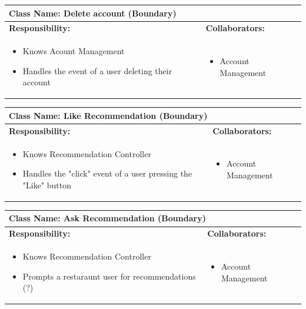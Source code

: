 \documentclass[]{article}
\begin{document}
\begin{table}[H]
	\centering
	\begin{tabular}{|p{7cm}|p{7cm}|}
	\hline 
	 \multicolumn{2}{|l|}{\textbf{Class Name:} Delete account (Boundary)} \\
	\hline
	\textbf{Responsibility:} & \textbf{Collaborators:} \\
	\hline
	\raggedright
	\begin{itemize}
		\item Knows Acount Management
		\item Handles the event of a user deleting their account
	\end{itemize}
	\vspace{1in} & 
	\begin{itemize}
		\item Account Management
	\end{itemize} \\
	\hline
	\end{tabular}
\end{table}

\begin{table}[H]
	\centering
	\begin{tabular}{|p{7cm}|p{7cm}|}
	\hline 
	 \multicolumn{2}{|l|}{\textbf{Class Name:} Like Recommendation (Boundary)} \\
	\hline
	\textbf{Responsibility:} & \textbf{Collaborators:} \\
	\hline
	\raggedright
	\begin{itemize}
		\item Knows Recommendation Controller
		\item Handles the "click" event of a user pressing the "Like" button
	\end{itemize}
	\vspace{1in} & 
	\begin{itemize}
		\item Account Management
	\end{itemize} \\
	\hline
	\end{tabular}
\end{table}

\begin{table}[H]
	\centering
	\begin{tabular}{|p{7cm}|p{7cm}|}
	\hline 
	 \multicolumn{2}{|l|}{\textbf{Class Name:} Ask Recommendation (Boundary)} \\
	\hline
	\textbf{Responsibility:} & \textbf{Collaborators:} \\
	\hline
	\raggedright
	\begin{itemize}
		\item Knows Recommendation Controller
		\item Prompts a restaraunt user for recommendations (?)
	\end{itemize}
	\vspace{1in} & 
	\begin{itemize}
		\item Account Management
	\end{itemize} \\
	\hline
	\end{tabular}
\end{table}
\end{document}
